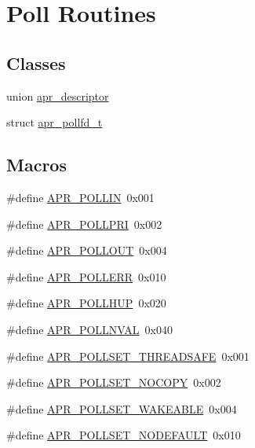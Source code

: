 \hypertarget{group__apr__poll}{}\section{Poll Routines}
\label{group__apr__poll}
\subsection*{Classes}
\begin{DoxyCompactItemize}
\item 
union \mbox{\hyperlink{unionapr__descriptor}{apr\+\_\+descriptor}}
\item 
struct \mbox{\hyperlink{structapr__pollfd__t}{apr\+\_\+pollfd\+\_\+t}}
\end{DoxyCompactItemize}
\subsection*{Macros}
\begin{DoxyCompactItemize}
\item 
\#define \mbox{\hyperlink{group__apr__poll_ga746222e6b858bc2fc77328d59f78e788}{A\+P\+R\+\_\+\+P\+O\+L\+L\+IN}}~0x001
\item 
\#define \mbox{\hyperlink{group__apr__poll_ga196c38e1914077c4c9a0cf3ce87f1b9c}{A\+P\+R\+\_\+\+P\+O\+L\+L\+P\+RI}}~0x002
\item 
\#define \mbox{\hyperlink{group__apr__poll_ga6fb703db1d11e2c5f66d8c6146e56053}{A\+P\+R\+\_\+\+P\+O\+L\+L\+O\+UT}}~0x004
\item 
\#define \mbox{\hyperlink{group__apr__poll_ga6f5a72fd9cf3f5dcf174acce0b4b77ee}{A\+P\+R\+\_\+\+P\+O\+L\+L\+E\+RR}}~0x010
\item 
\#define \mbox{\hyperlink{group__apr__poll_gace76603c4fa4b56f8b5977ff1ceb6f3b}{A\+P\+R\+\_\+\+P\+O\+L\+L\+H\+UP}}~0x020
\item 
\#define \mbox{\hyperlink{group__apr__poll_ga132da215e207d4685fb467cc64a73f1b}{A\+P\+R\+\_\+\+P\+O\+L\+L\+N\+V\+AL}}~0x040
\item 
\#define \mbox{\hyperlink{group__apr__poll_gabdfaccfd394c847f692351dee2e5ef7f}{A\+P\+R\+\_\+\+P\+O\+L\+L\+S\+E\+T\+\_\+\+T\+H\+R\+E\+A\+D\+S\+A\+FE}}~0x001
\item 
\#define \mbox{\hyperlink{group__apr__poll_ga0febaf4378d2705bf1256b22fe8dfd24}{A\+P\+R\+\_\+\+P\+O\+L\+L\+S\+E\+T\+\_\+\+N\+O\+C\+O\+PY}}~0x002
\item 
\#define \mbox{\hyperlink{group__apr__poll_ga552d7f28d442602e6c9bb6931f183493}{A\+P\+R\+\_\+\+P\+O\+L\+L\+S\+E\+T\+\_\+\+W\+A\+K\+E\+A\+B\+LE}}~0x004
\item 
\#define \mbox{\hyperlink{group__apr__poll_gaa46a9cbb23b2e8e71dd3ba88e69fdf13}{A\+P\+R\+\_\+\+P\+O\+L\+L\+S\+E\+T\+\_\+\+N\+O\+D\+E\+F\+A\+U\+LT}}~0x010
\end{DoxyCompactItemize}
